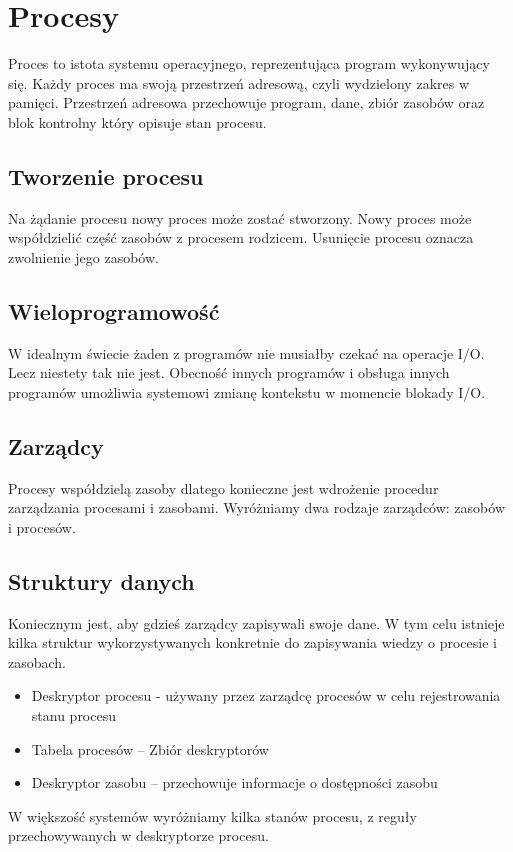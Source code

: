 \documentclass{../notatki}
\begin{document}
\section{Procesy}

Proces to istota systemu operacyjnego, reprezentująca program wykonywujący się.
Każdy proces ma swoją przestrzeń adresową, czyli wydzielony zakres w pamięci.
Przestrzeń adresowa przechowuje program, dane, zbiór zasobów oraz
blok kontrolny który opisuje stan procesu.

\subsection{Tworzenie procesu}

Na żądanie procesu nowy proces może zostać stworzony. Nowy proces
może współdzielić część zasobów z procesem rodzicem. Usunięcie procesu oznacza
zwolnienie jego zasobów.

\subsection{Wieloprogramowość}

W idealnym świecie żaden z programów nie musiałby czekać na operacje I/O.
Lecz niestety tak nie jest. Obecność innych programów i obsługa innych programów
umożliwia systemowi zmianę kontekstu w momencie blokady I/O.

\subsection{Zarządcy}

Procesy współdzielą zasoby dlatego konieczne jest wdrożenie procedur
zarządzania procesami i zasobami. Wyróżniamy dwa rodzaje zarządców:
zasobów i procesów.

\subsection{Struktury danych}

Koniecznym jest, aby gdzieś zarządcy zapisywali swoje dane. W tym celu istnieje
kilka struktur wykorzystywanych konkretnie do zapisywania wiedzy o
procesie i zasobach.

\begin{itemize}
  \item Deskryptor procesu - używany przez zarządcę procesów w celu
    rejestrowania stanu procesu
  \item Tabela procesów – Zbiór deskryptorów
  \item Deskryptor zasobu – przechowuje informacje o dostępności zasobu
\end{itemize}
W większość systemów wyróżniamy kilka stanów procesu, z reguły przechowywanych
w deskryptorze procesu.
\end{document}
